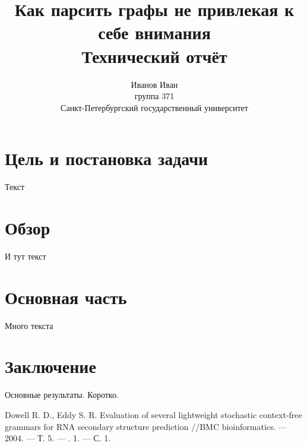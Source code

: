 \documentclass[a4paper]{article}
\title{Как парсить графы не привлекая к себе внимания \\
Технический отчёт}
\author{Иванов Иван\\
группа 371\\
Санкт-Петербургский государственный университет\\
}
\begin{document}
\maketitle
\thispagestyle{empty}

\section{Цель и постановка задачи}

Текст

\section{Обзор}

И тут текст~\cite{SCFGRNA1}

\section{Основная часть}

Много текста

\section{Заключение}

Основные результаты. Коротко.

\begin{thebibliography}{99}
  
Dowell R. D., Eddy S. R. Evaluation of several lightweight stochastic context-free grammars for RNA 
secondary structure prediction //BMC bioinformatics. --- 2004. --- Т. 5. --- \textnumero. 1. --- С. 1.

\end{thebibliography}
\end{document}
